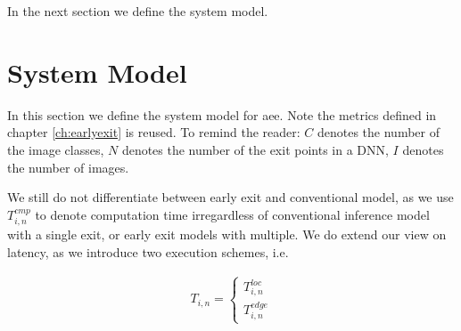 In the next section we define the system model.

\section{System Model} \label{sec:edge-system-model}

In this section we define the system model for \gls{aee}. Note the metrics defined in chapter \ref{ch:earlyexit} is reused. To remind the reader:  $ C $ denotes the number of the image classes, $ N $ denotes the number of the exit points in a DNN, $ I $ denotes the number of images. 

We still do not differentiate between early exit and conventional model,  as we use $ T_{i,n}^{cmp} $ to denote computation time irregardless of conventional inference model with a single exit, or early exit models with multiple. We do extend our view on latency, as we introduce two execution schemes, i.e.

	\begin{align}
		T_{i,n} = \begin{cases}
		T_{i,n}^{loc} \\
		T_{i,n}^{edge}
		\end{cases}
	\end{align}
		
